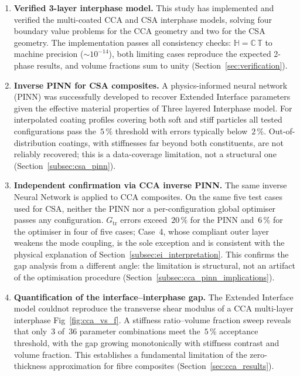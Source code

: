 \documentclass[oneside, 12pt, a4paper, bibliography=totoc]{book}
\newcommand{\tens}[1]{\mathbb{#1}}                 %
\begin{document}
\begin{enumerate}
    \item \textbf{Verified 3-layer interphase model.} This study has implemented and verified the multi-coated CCA and CSA interphase models, solving four boundary value problems for the CCA geometry and two for the CSA geometry. The implementation passes all consistency checks: $\tens{H} = \tens{C}\,\tens{T}$ to machine precision ($\sim 10^{-14}$), both limiting cases reproduce the expected 2-phase results, and volume fractions sum to unity (Section~\ref{sec:verification}).


    \item \textbf{Inverse PINN for CSA composites.} A physics-informed neural network (PINN) was successfully developed to recover Extended Interface parameters given the effective material properties of Three layered Interphase model. For interpolated coating profiles covering both soft and stiff particles all tested configurations pass the~$5\,\%$ threshold with errors typically below~$2\,\%$. Out-of-distribution coatings, with stiffnesses far beyond both constituents, are not reliably recovered; this is a data-coverage limitation, not a structural one (Section~\ref{subsec:csa_pinn}).

    \item \textbf{Independent confirmation via CCA inverse PINN.} The same inverse Neural Network is applied to CCA composites. On the same five test cases used for CSA, neither the PINN nor a per-configuration global optimiser passes any configuration. $G_{\text{tr}}$ errors exceed~$20\,\%$ for the PINN and~$6\,\%$ for the optimiser in four of five cases; Case~4, whose compliant outer layer weakens the mode coupling, is the sole exception and is consistent with the physical explanation of Section~\ref{subsec:ei_interpretation}. This confirms the gap analysis from a different angle: the limitation is structural, not an artifact of the optimisation procedure (Section~\ref{subsec:cca_pinn_implications}).

    \item \textbf{Quantification of the interface--interphase gap.}  The Extended Interface model couldnot reproduce the transverse shear modulus of a CCA multi-layer interphase Fig~\ref{fig:cca_vs_f}. A stiffness ratio--volume fraction sweep reveals that only~3 of~36 parameter combinations meet the~$5\,\%$ acceptance threshold, with the gap growing monotonically with stiffness contrast and volume fraction. This establishes a fundamental limitation of the zero-thickness approximation for fibre composites (Section~\ref{sec:cca_results}).
\end{enumerate}
\end{document}
